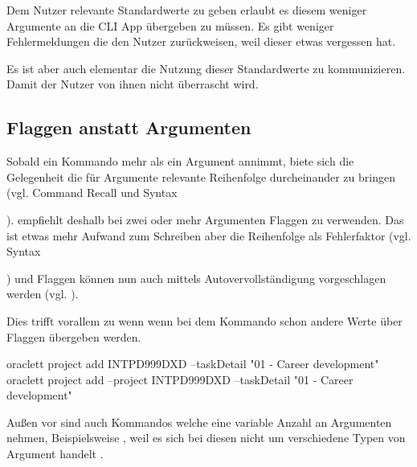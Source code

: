\documentclass[oneside,bibliography=totocnumbered,BCOR=5mm]{scrbook}
\newenvironment{code}{\captionsetup{type=listing, skip=0pt}}{}
\begin{document}
\bigskip


Dem Nutzer relevante Standardwerte zu geben erlaubt es diesem weniger
Argumente an die CLI App übergeben zu müssen. Es gibt weniger Fehlermeldungen
die den Nutzer zurückweisen, weil dieser etwas vergessen hat.

Es ist aber auch elementar die Nutzung dieser Standardwerte zu kommunizieren.
Damit der Nutzer von ihnen nicht überrascht wird.

\subsection{Flaggen anstatt Argumenten}

Sobald ein Kommando mehr als ein Argument annimmt, biete sich die Gelegenheit
die für Argumente relevante Reihenfolge durcheinander zu bringen (vgl. Command
Recall und Syntax %

). \cite{12factor} empfiehlt deshalb bei zwei oder mehr Argumenten Flaggen zu
verwenden. Das ist etwas mehr Aufwand zum Schreiben aber die Reihenfolge als
Fehlerfaktor (vgl. Syntax

) und Flaggen können nun auch mittels Autovervollständigung vorgeschlagen werden
(vgl. ).


Dies trifft vorallem zu wenn wenn bei dem Kommando schon andere Werte über
Flaggen übergeben werden.

\begin{code}
  \begin{shellcode}
oraclett project add INTPD999DXD --taskDetail "01 - Career development"
oraclett project add --project INTPD999DXD --taskDetail "01 - Career development"
  \end{shellcode}
  \medskip
\end{code}

Außen vor sind auch Kommandos welche eine variable Anzahl an Argumenten nehmen,
Beispielsweise , weil es sich bei diesen nicht
um verschiedene Typen von Argument handelt \parencite{12factor}.
\end{document}
